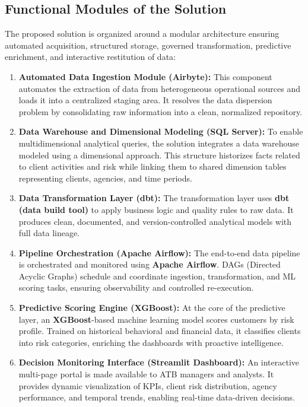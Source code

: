 \subsection{Functional Modules of the Solution}

The proposed solution is organized around a modular architecture ensuring automated
acquisition, structured storage, governed transformation, predictive enrichment, and
interactive restitution of data:

\begin{enumerate}
    \item \textbf{Automated Data Ingestion Module (Airbyte):}
    This component automates the extraction of data from heterogeneous operational sources
    and loads it into a centralized staging area. It resolves the data dispersion problem
    by consolidating raw information into a clean, normalized repository.

    \item \textbf{Data Warehouse and Dimensional Modeling (SQL Server):}
    To enable multidimensional analytical queries, the solution integrates a data warehouse
    modeled using a dimensional approach. This structure historizes facts related to client
    activities and risk while linking them to shared dimension tables representing clients,
    agencies, and time periods.

    \item \textbf{Data Transformation Layer (dbt):}
    The transformation layer uses \textbf{dbt (data build tool)} to apply business logic
    and quality rules to raw data. It produces clean, documented, and version-controlled
    analytical models with full data lineage.

    \item \textbf{Pipeline Orchestration (Apache Airflow):}
    The end-to-end data pipeline is orchestrated and monitored using \textbf{Apache Airflow}.
    DAGs (Directed Acyclic Graphs) schedule and coordinate ingestion, transformation, and
    ML scoring tasks, ensuring observability and controlled re-execution.

    \item \textbf{Predictive Scoring Engine (XGBoost):}
    At the core of the predictive layer, an \textbf{XGBoost}-based machine learning model
    scores customers by risk profile. Trained on historical behavioral and financial data,
    it classifies clients into risk categories, enriching the dashboards with proactive
    intelligence.

    \item \textbf{Decision Monitoring Interface (Streamlit Dashboard):}
    An interactive multi-page portal is made available to ATB managers and analysts. It
    provides dynamic visualization of KPIs, client risk distribution, agency performance,
    and temporal trends, enabling real-time data-driven decisions.
\end{enumerate}

